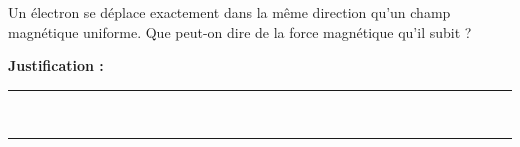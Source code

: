 Un électron se déplace exactement dans la même direction qu'un champ magnétique uniforme. Que peut-on dire de la force magnétique qu'il subit ?

\choices

\noindent\textbf{Justification :} \hrulefill \\[2.5ex]
\rule{\linewidth}{0.4pt} \\[2.5ex]
\rule{\linewidth}{0.4pt}
\vfill
